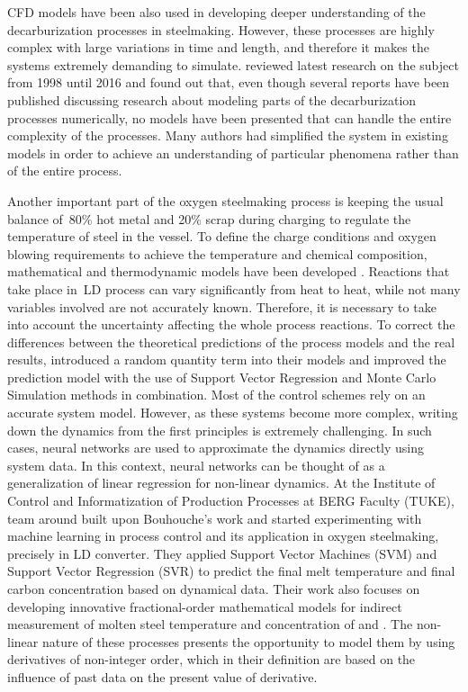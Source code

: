 CFD models have been also used in developing deeper understanding of the decarburization processes in steelmaking. However, these processes are highly complex with large variations in time and length, and therefore it makes the systems extremely demanding to simulate. \citet{Ersson2018} reviewed latest research on the subject from 1998 until 2016 and found out that, even though several reports have been published discussing research about modeling parts of the decarburization processes numerically, no models have been presented that can handle the entire complexity of the processes. Many authors had simplified the system in existing models in order to achieve an understanding of particular phenomena rather than of the entire process.

Another important part of the oxygen steelmaking process is keeping the usual balance of~80\% hot metal and 20\% scrap during charging to regulate the temperature of steel in the vessel. To define the charge conditions and oxygen blowing requirements to achieve the temperature and chemical composition, mathematical and thermodynamic models have been developed \citep{Kacur2019,Sprava2018}. Reactions that take place in~LD process can vary significantly from heat to heat, while not many variables involved are not accurately known. Therefore, it is necessary to take into account the uncertainty affecting the whole process reactions. To correct the differences between the theoretical predictions of the process models and the real results, \citet{Bouhouche2012} introduced a random quantity term into their models and improved the prediction model with the use of Support Vector Regression and Monte Carlo Simulation methods in combination. Most of the control schemes rely on an accurate system model. However, as these systems become more complex, writing down the dynamics from the first principles is extremely challenging. In such cases, neural networks are used to approximate the dynamics directly using system data. In this context, neural networks can be thought of as a generalization of linear regression for non-linear dynamics. At the Institute of Control and Informatization of Production Processes at BERG Faculty (TUKE), team around \citet{Sprava2018} built upon Bouhouche's work and started experimenting with machine learning in process control and its application in oxygen steelmaking, precisely in LD converter. They applied Support Vector Machines (SVM) and Support Vector Regression (SVR) to predict the final melt temperature and final carbon concentration based on dynamical data. Their work also focuses on developing innovative fractional-order mathematical models for indirect measurement of molten steel temperature and concentration of  and . The non-linear nature of these processes presents the opportunity to model them by using derivatives of non-integer order, which in their definition are based on the influence of past data on the present value of derivative.

